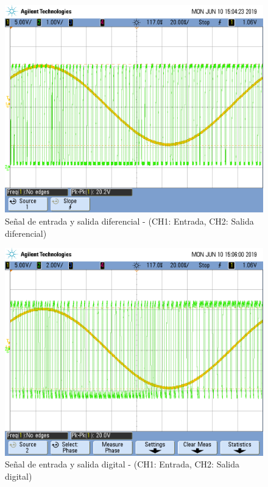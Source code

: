 \documentclass[assd_tp3_main.tex]{subfiles}
\begin{document}
\begin{figure}[!ht]
\begin{centering}
\includegraphics[scale=0.25]{../EJ4/Mediciones/Seno/s1_2.png}
\par\end{centering}
\caption{Señal de entrada y salida diferencial - (CH1: Entrada, CH2: Salida diferencial)}
\end{figure}


\begin{figure}[!ht]
\begin{centering}
\includegraphics[scale=0.25]{../EJ4/Mediciones/Seno/s1_3.png}
\par\end{centering}
\caption{Señal de entrada y salida digital - (CH1: Entrada, CH2: Salida digital)}
\end{figure}
\end{document}
